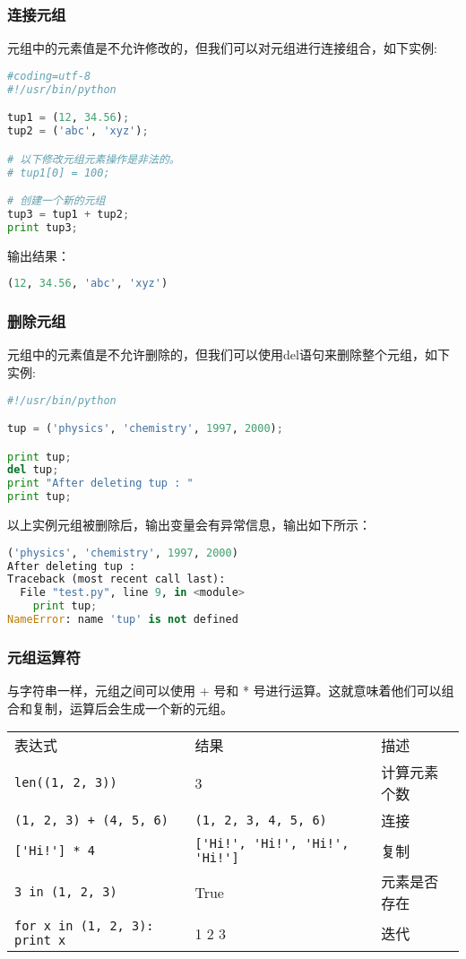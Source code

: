 \subsubsection{连接元组}
元组中的元素值是不允许修改的，但我们可以对元组进行连接组合，如下实例:
\begin{lstlisting}[language=Python]
#coding=utf-8
#!/usr/bin/python

tup1 = (12, 34.56);
tup2 = ('abc', 'xyz');

# 以下修改元组元素操作是非法的。
# tup1[0] = 100;

# 创建一个新的元组
tup3 = tup1 + tup2;
print tup3;
\end{lstlisting}
输出结果：
\begin{lstlisting}[language=Python]
(12, 34.56, 'abc', 'xyz')
\end{lstlisting}


\subsubsection{删除元组}
元组中的元素值是不允许删除的，但我们可以使用del语句来删除整个元组，如下实例:
\begin{lstlisting}[language=Python]
#!/usr/bin/python

tup = ('physics', 'chemistry', 1997, 2000);

print tup;
del tup;
print "After deleting tup : "
print tup;
\end{lstlisting}
以上实例元组被删除后，输出变量会有异常信息，输出如下所示：
\begin{lstlisting}[language=Python]
('physics', 'chemistry', 1997, 2000)
After deleting tup :
Traceback (most recent call last):
  File "test.py", line 9, in <module>
    print tup;
NameError: name 'tup' is not defined
\end{lstlisting}


\subsubsection{元组运算符}
与字符串一样，元组之间可以使用 + 号和 * 号进行运算。这就意味着他们可以组合和复制，运算后会生成一个新的元组。

\begin{tabular}{l|l|l}
表达式&	结果&	描述\\
\verb|len((1, 2, 3))|&	3	&计算元素个数\\
\verb|(1, 2, 3) + (4, 5, 6)|	&\verb|(1, 2, 3, 4, 5, 6)|&	连接\\
\verb|['Hi!'] * 4|	&\verb|['Hi!', 'Hi!', 'Hi!', 'Hi!']| &	复制\\
\verb|3 in (1, 2, 3)|&	True&	元素是否存在\\
\verb|for x in (1, 2, 3): print x| &	1 2 3	&迭代
\end{tabular}


